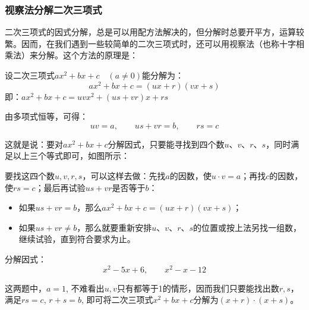 \subsubsection{视察法分解二次三项式}
二次三项式的因式分解，总是可以用配方法解决的，但分解时总要开平方，运算较繁。因而，在我们遇到一些较简单的二次三项式时，还可以用视察法（也称十字相乘法）来分解。这个方法的原理是：

设二次三项式$ax^2+bx+c\quad (a\ne 0)$能分解为：
\[ax^2+bx+c  =(ux+r)(vx+s)\]
即：$ax^2+bx+c=uv x^2+(us+vr)x+rs$

由多项式恒等，可得：
\[uv=a,\qquad us+vr=b,\qquad rs=c\]

这就是说：要对$ax^2+bx+c$分解因式，只要能寻找到四个数$u$、$v$、$r$、$s$，同时满足以上三个等式即可，如图所示：

\begin{center}
\end{center}


要找这四个数$u,v,r,s$，可以这样去做：先找$a$的因数，使$u\cdot v=a$；再找$c$的因数，使$rs=c$；最后再试验$us+vr$是否等于$b$：
\begin{itemize}
    \item 如果$us+vr=b$，那么$ax^2+bx+c= (ux+r) (vx+s)$；
\item 如果$us+vr\ne b$，那么就要重新安排$u$、$v$、$r$、$s$的位置或按上法另找一组数，继续试验，直到符合要求为止。
\end{itemize}

\begin{example}
分解因式：
\[x^2-5x+6,\qquad x^2-x-12\]   
\end{example}

\begin{analyze}
    这两题中，$a=1$, 不难看出$u,v$只有都等于1的情形，因而我们只要能找出数$r,s$，满足$rs=c$, $r+s=b$, 即可将二次三项式$x^2+bx+c$分解为$(x+r)\cdot (x+s)$。
\end{analyze}

